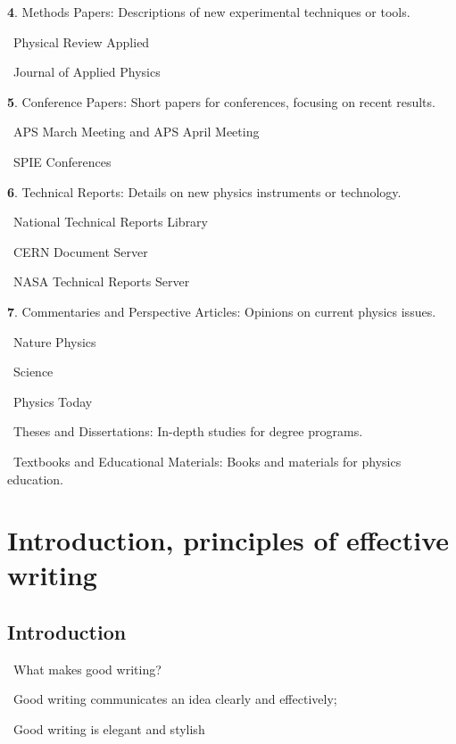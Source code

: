 \documentclass[a4paper, 12pt]{article}
\begin{document}
\textbf{4}. Methods Papers: Descriptions of new experimental techniques or tools.
\par\quad\textopenbullet\ Physical Review Applied
\par\quad\textopenbullet\ Journal of Applied Physics

\textbf{5}. Conference Papers: Short papers for conferences, focusing on recent results.
\par\quad\textopenbullet\ APS March Meeting and APS April Meeting
\par\quad\textopenbullet\ SPIE Conferences

\textbf{6}. Technical Reports: Details on new physics instruments or technology.
\par\quad\textopenbullet\ National Technical Reports Library
\par\quad\textopenbullet\ CERN Document Server
\par\quad\textopenbullet\ NASA Technical Reports Server

\textbf{7}. Commentaries and Perspective Articles: Opinions on current physics issues.
\par\quad\textopenbullet\ Nature Physics
\par\quad\textopenbullet\ Science
\par\quad\textopenbullet\ Physics Today

\vspace{4pt}\par\textbullet\ Theses and Dissertations: In-depth studies for degree programs.
\vspace{4pt}\par\textbullet\ Textbooks and Educational Materials: Books and materials for physics education.

\newpage\section{Introduction, principles of effective writing}

\subsection{Introduction}

\vspace{4pt}\par\textbullet\ What makes good writing?
\par\quad\textopenbullet\ Good writing communicates an idea clearly and effectively;
\par\quad\textopenbullet\ Good writing is elegant and stylish
\end{document}
